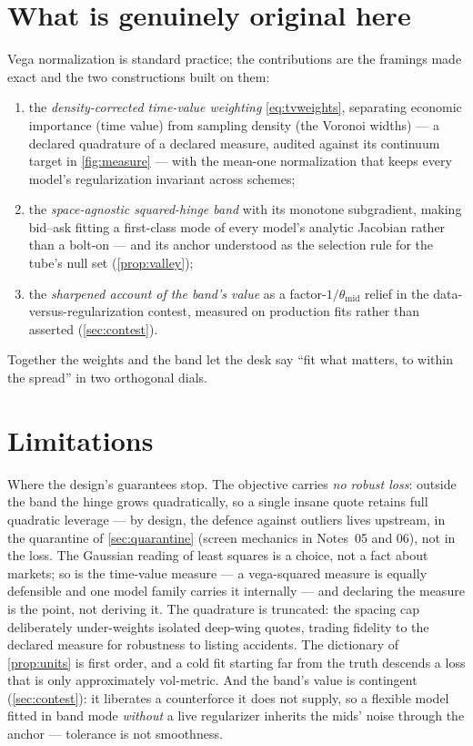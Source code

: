 \documentclass[11pt]{article}
\begin{document}
\section{What is genuinely original here}
\label{sec:original}

Vega normalization is standard practice; the contributions are the
framings made exact and the two constructions built on them:
\begin{enumerate}[leftmargin=1.6em]
\item the \emph{density-corrected time-value weighting}
\eqref{eq:tvweights}, separating economic importance (time value) from
sampling density (the Voronoi widths) --- a declared quadrature of a
declared measure, audited against its continuum target in
\cref{fig:measure} --- with the mean-one normalization that keeps every
model's regularization invariant across schemes;
\item the \emph{space-agnostic squared-hinge band} with its monotone
subgradient, making bid--ask fitting a first-class mode of every model's
analytic Jacobian rather than a bolt-on --- and its anchor understood as
the selection rule for the tube's null set (\cref{prop:valley});
\item the \emph{sharpened account of the band's value} as a
factor-$1/\theta_{\mathrm{mid}}$ relief in the data-versus-regularization
contest, measured on production fits rather than asserted
(\cref{sec:contest}).
\end{enumerate}
Together the weights and the band let the desk say ``fit what matters,
to within the spread'' in two orthogonal dials.

\section{Limitations}
\label{sec:limits}

Where the design's guarantees stop.  The objective carries \emph{no
robust loss}: outside the band the hinge grows quadratically, so a
single insane quote retains full quadratic leverage --- by design, the
defence against outliers lives upstream, in the quarantine of
\cref{sec:quarantine} (screen mechanics in Notes~05 and 06), not in the
loss.  The Gaussian reading of
least squares is a choice, not a fact about markets; so is the
time-value measure --- a vega-squared measure is equally defensible and
one model family carries it internally --- and declaring the measure is
the point, not deriving it.  The quadrature is truncated: the spacing
cap deliberately under-weights isolated deep-wing quotes, trading
fidelity to the declared measure for robustness to listing accidents.
The dictionary of \cref{prop:units} is first order, and a cold fit
starting far from the truth descends a loss that is only approximately
vol-metric.  And the band's value is contingent (\cref{sec:contest}): it
liberates a counterforce it does not supply, so a flexible model fitted
in band mode \emph{without} a live regularizer inherits the mids' noise
through the anchor --- tolerance is not smoothness.
\end{document}
